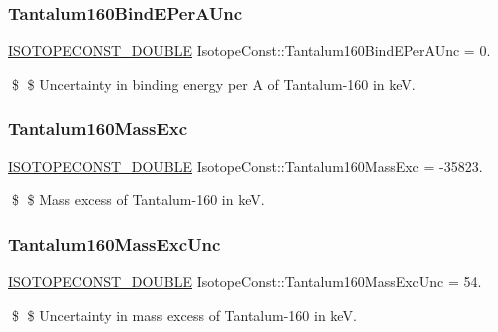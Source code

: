 \subsubsection{\texorpdfstring{Tantalum160\+Bind\+E\+Per\+A\+Unc}{Tantalum160BindEPerAUnc}}
{\footnotesize\ttfamily \mbox{\hyperlink{group___isotope_const-_macros_ga8f45a7272ce02c0b4c65c44636ed719a}{I\+S\+O\+T\+O\+P\+E\+C\+O\+N\+S\+T\+\_\+\+D\+O\+U\+B\+LE}} Isotope\+Const\+::\+Tantalum160\+Bind\+E\+Per\+A\+Unc = 0.}

\$ \$ Uncertainty in binding energy per A of Tantalum-\/160 in keV. \mbox{\label{group___isotope_const-_tantalum-_ta160_ga729d883ff11a773b4988c0560253c461}} 
\subsubsection{\texorpdfstring{Tantalum160\+Mass\+Exc}{Tantalum160MassExc}}
{\footnotesize\ttfamily \mbox{\hyperlink{group___isotope_const-_macros_ga8f45a7272ce02c0b4c65c44636ed719a}{I\+S\+O\+T\+O\+P\+E\+C\+O\+N\+S\+T\+\_\+\+D\+O\+U\+B\+LE}} Isotope\+Const\+::\+Tantalum160\+Mass\+Exc = -\/35823.}

\$ \$ Mass excess of Tantalum-\/160 in keV. \mbox{\label{group___isotope_const-_tantalum-_ta160_gae3861b8db82b07e62fa2e7e9d487a0f5}} 
\subsubsection{\texorpdfstring{Tantalum160\+Mass\+Exc\+Unc}{Tantalum160MassExcUnc}}
{\footnotesize\ttfamily \mbox{\hyperlink{group___isotope_const-_macros_ga8f45a7272ce02c0b4c65c44636ed719a}{I\+S\+O\+T\+O\+P\+E\+C\+O\+N\+S\+T\+\_\+\+D\+O\+U\+B\+LE}} Isotope\+Const\+::\+Tantalum160\+Mass\+Exc\+Unc = 54.}

\$ \$ Uncertainty in mass excess of Tantalum-\/160 in keV. \mbox{\label{group___isotope_const-_tantalum-_ta160_gac531b811e9a37f94fcaf28eed8a51145}} 
